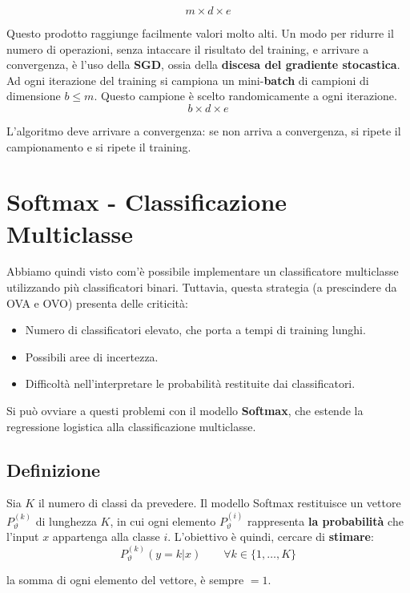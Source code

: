 $$
m \times d \times e
$$

Questo prodotto raggiunge facilmente valori molto alti. Un modo per ridurre il numero di operazioni, senza intaccare il risultato del training, e arrivare a convergenza, è l'uso della \textbf{SGD}, ossia della \textbf{discesa del gradiente stocastica}. Ad ogni iterazione del training si campiona un mini-\textbf{batch} di campioni di dimensione $b \leq m$. Questo campione è scelto randomicamente a ogni iterazione.
$$
b \times d \times e
$$

L'algoritmo deve arrivare a convergenza: se non arriva a convergenza, si ripete il campionamento e si ripete il training.

\section{Softmax - Classificazione Multiclasse}
Abbiamo quindi visto com'è possibile implementare un classificatore multiclasse utilizzando più classificatori binari. Tuttavia, questa strategia (a prescindere da OVA e OVO) presenta delle criticità:

\begin{itemize}
	\item Numero di classificatori elevato, che porta a tempi di training lunghi.
	\item Possibili aree di incertezza.
	\item Difficoltà nell'interpretare le probabilità restituite dai classificatori.
\end{itemize}

Si può ovviare a questi problemi con il modello \textbf{Softmax}, che estende la regressione logistica alla classificazione multiclasse.

\subsection{Definizione}
Sia $K$ il numero di classi da prevedere. Il modello Softmax restituisce un vettore $P_\vartheta^{(k)}$ di lunghezza $K$, in cui ogni elemento $P_\vartheta^{(i)}$ rappresenta \textbf{la probabilità} che l'input $x$ appartenga alla classe $i$. L'obiettivo è quindi, cercare di \textbf{stimare}:
\[
P_{\vartheta}^{(k)}(y=k | x) \qquad \forall k \in \{1, \ldots, K\}
\]

la somma di ogni elemento del vettore, è sempre $=1$.
